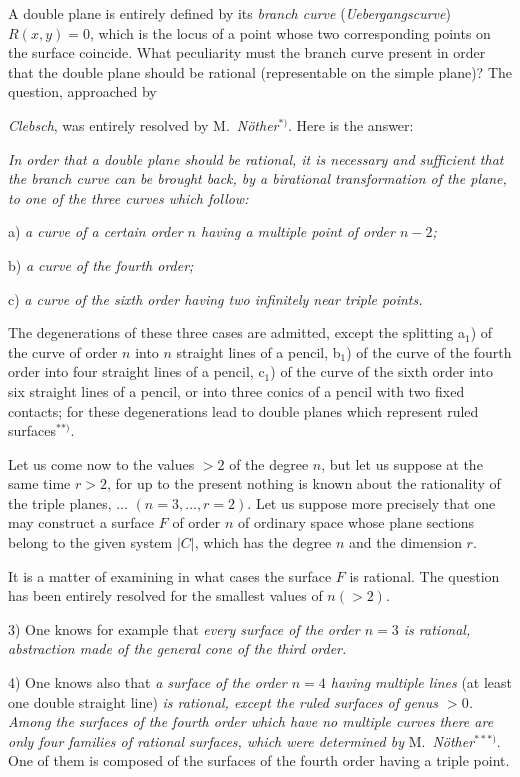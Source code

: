 \documentclass{article}
\begin{document}
A double plane is entirely defined by its \emph{branch curve} (\emph{Uebergangscurve}) $R(x, y) = 0$, which is the locus of a point whose two corresponding points on the surface coincide. What peculiarity must the branch curve present in order that the double plane should be rational (representable on the simple plane)? The question, approached by

\emph{Clebsch}, was entirely resolved by M.\ \emph{Nöther}${}^{*)}$. Here is the answer:

\emph{In order that a double plane should be rational, it is necessary and sufficient that the branch curve can be brought back, by a birational transformation of the plane, to one of the three curves which follow:}

a) \emph{a curve of a certain order $n$ having a multiple point of order $n - 2$;}

b) \emph{a curve of the fourth order;}

c) \emph{a curve of the sixth order having two infinitely near triple points.}

The degenerations of these three cases are admitted, except the splitting a${}_{1}$) of the curve of order $n$ into $n$ straight lines of a pencil, b${}_{1}$) of the curve of the fourth order into four straight lines of a pencil, c${}_{1}$) of the curve of the sixth order into six straight lines of a pencil, or into three conics of a pencil with two fixed contacts; for these degenerations lead to double planes which represent ruled surfaces${}^{**)}$.

Let us come now to the values $> 2$ of the degree $n$, but let us suppose at the same time $r > 2$, for up to the present nothing is known about the rationality of the triple planes, $\ldots$ $(n = 3, \ldots, r = 2)$. Let us suppose more precisely that one may construct a surface $F$ of order $n$ of ordinary space whose plane sections belong to the given system $|C|$, which has the degree $n$ and the dimension $r$.

It is a matter of examining in what cases the surface $F$ is rational. The question has been entirely resolved for the smallest values of $n(> 2)$.

3) One knows for example that \emph{every surface of the order $n = 3$ is rational, abstraction made of the general cone of the third order.}

4) One knows also that \emph{a surface of the order $n = 4$ having multiple lines} (at least one double straight line) \emph{is rational, except the ruled surfaces of genus $> 0$. Among the surfaces of the fourth order which have no multiple curves there are only four families of rational surfaces, which were determined by} M.\ \emph{Nöther}${}^{***)}$. One of them is composed of the surfaces of the fourth order having a triple point.
\end{document}
